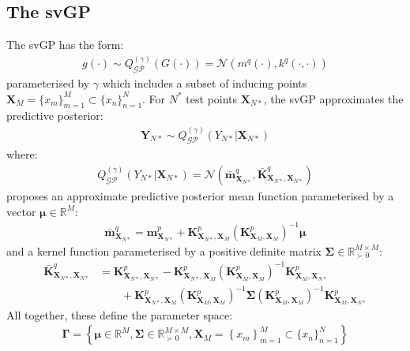 \documentclass{article}
\newcommand{\GP}{\operatorname{\mathcal{GP}}}
\numberwithin{equation}{section}
\begin{document}
\subsection{The svGP}
The svGP has the form:
\begin{align}
g(\cdot) \sim Q^{(\gamma)}_{\GP}(G(\cdot)) = \mathcal{N}\left(m^{q}(\cdot), k^{q}(\cdot, \cdot)\right)
\label{svgp}
\end{align}
parameterised by $\gamma$ which includes a subset of inducing points $\mathbf{X}_M = \{x_m\}_{m=1}^{M} \subset \{x_n\}_{n=1}^{N}$. For $N^*$ test points $\mathbf{X}_{N*}$, the svGP approximates the predictive posterior:
\begin{align}
    \mathbf{Y}_{N*} \sim Q_{\GP}^{(\gamma)}\left(Y_{N*} \vert \mathbf{X}_{N*}\right)
\end{align}
where:
\begin{align}
    Q_{\GP}^{(\gamma)}\left(Y_{N*} \vert \mathbf{X}_{N*}\right) = \mathcal{N}\left(\bar{\mathbf{m}}_{\mathbf{X}_{N*}}^{q}, \bar{\mathbf{K}}_{\mathbf{X}_{N*}, \mathbf{X}_{N*}}^{q}\right)
\end{align}
\cite{titsias2009variational} proposes an approximate predictive posterior mean function parameterised by a vector $\boldsymbol{\mu} \in \mathbb{R}^M$:
\begin{align}
    \label{svgp-mean} 
    \bar{\mathbf{m}}_{\mathbf{X}_{N*}}^{q} = \mathbf{m}^p_{\mathbf{X}_{N*}} + \mathbf{K}^p_{\mathbf{X}_{N*}, \mathbf{X}_M}\left(\mathbf{K}^p_{\mathbf{X}_M,\mathbf{X}_M}\right)^{-1} \boldsymbol{\mu}
\end{align}
and a kernel function parameterised by a positive definite matrix $\mathbf{\Sigma} \in \mathbb{R}^{M\times M}_{\succ 0}$:
\begin{align}
\bar{\mathbf{K}}_{\mathbf{X}_{N*}, \mathbf{X}_{N*}}^{q} & = \mathbf{K}^p_{\mathbf{X}_{N*}, \mathbf{X}_{N*}} - \mathbf{K}^p_{\mathbf{X}_{N*}, \mathbf{X}_M} \left(\mathbf{K}^p_{\mathbf{X}_M, \mathbf{X}_M}\right)^{-1}\mathbf{K}^p_{\mathbf{X}_M, \mathbf{X}_{N*}} \nonumber \\
&\qquad + \mathbf{K}^p_{\mathbf{X}_{N*}, \mathbf{X}_M}  \left(\mathbf{K}^p_{\mathbf{X}_M, \mathbf{X}_M}\right)  ^{-1} \mathbf{\Sigma} \left(\mathbf{K}^p_{\mathbf{X}_M, \mathbf{X}_M}\right)^{-1}\mathbf{K}^p_{\mathbf{X}_M, \mathbf{X}_{N*}}
\label{svgp-covariance}
\end{align}
All together, these define the parameter space:
\begin{align}
    \mathbf{\Gamma} = \left\{\boldsymbol{\mu} \in \mathbb{R}^{M}, \mathbf{\Sigma} \in \mathbb{R}^{M\times M}_{\succ 0}, \mathbf{X}_M = \left\{x_m\right\}_{m=1}^{M} \subset \{x_n\}_{n=1}^{N}\right\}
    \label{svgp-parameter-space}
\end{align}
\end{document}
